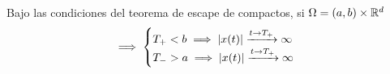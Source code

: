 \begin{cor}
	Bajo las condiciones del teorema de escape de compactos, si $\Omega = (a, b) \times \mathbb{R}^d$
	\[\implies \begin{cases}
		T_+ < b \implies \left|x(t)\right| \xrightarrow{t\to T_+} \infty \\
		T_- > a \implies \left|x(t)\right| \xrightarrow{t\to T_+} \infty \\
	\end{cases}\]
\end{cor}